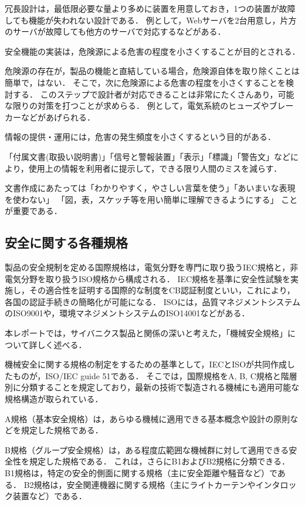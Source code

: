 \documentclass[uplatex,a4paper]{jsarticle}
\begin{document}
冗長設計は，最低限必要な量より多めに装置を用意しておき，1つの装置が故障しても機能が失われない設計である．
例として，Webサーバを2台用意し，片方のサーバが故障しても他方のサーバで対応するなどがある．


安全機能の実装は，危険源による危害の程度を小さくすることが目的とされる．

危険源の存在が，製品の機能と直結している場合，危険源自体を取り除くことは簡単で，はない．
そこで，次に危険源による危害の程度を小さくすることを検討する．
このステップで設計者が対応できることは非常にたくさんあり，可能な限りの対策を打つことが求めらる．
例として，電気系統のヒューズやブレーカーなどがあげられる．


情報の提供・運用には，危害の発生頻度を小さくするという目的がある．

「付属文書(取扱い説明書)」「信号と警報装置」「表示」「標識」「警告文」などにより，使用上の情報を利用者に提示して，できる限り人間のミスを減らす．

文書作成にあたっては「わかりやすく，やさしい言葉を使う」「あいまいな表現を使わない」 「図，表，スケッチ等を用い簡単に理解できるようにする」 ことが重要である．



\subsection{安全に関する各種規格}
製品の安全規制を定める国際規格は，電気分野を専門に取り扱うIEC規格と，非電気分野を取り扱うISO規格から構成される．
IEC規格を基準に安全性試験を実施し，その適合性を証明する国際的な制度をCB認証制度といい，これにより，各国の認証手続きの簡略化が可能になる．
ISOには，品質マネジメントシステムのISO9001や，環境マネジメントシステムのISO14001などがある．

本レポートでは，サイバニクス製品と関係の深いと考えた，「機械安全規格」について詳しく述べる．

機械安全に関する規格の制定をするための基準として，IECとISOが共同作成したものが，ISO/IEC guide 51である．
そこでは，国際規格をA, B, C規格と階層別に分類することを規定しており，最新の技術で製造される機械にも適用可能な規格構造が取られている．

A規格（基本安全規格）は，あらゆる機械に適用できる基本概念や設計の原則などを規定した規格である．

B規格（グループ安全規格）は，ある程度広範囲な機械群に対して適用できる安全性を規定した規格である．
これは，さらにB1およびB2規格に分類できる．
B1規格は，特定の安全的側面に関する規格（主に安全距離や騒音など）である．
B2規格は，安全関連機器に関する規格（主にライトカーテンやインタロック装置など）である．
\end{document}
